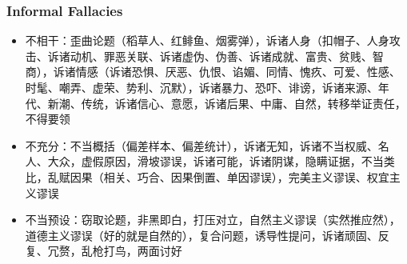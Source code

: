 \documentclass[UTF8,11pt,colorlinks,compress,openany]{beamer}%
\begin{document}
\begin{frame}\frametitle{Informal Fallacies}
\begin{itemize}
	\item 不相干：歪曲论题（稻草人、红鲱鱼、烟雾弹），诉诸人身（扣帽子、人身攻击、诉诸动机、罪恶关联、诉诸虚伪、伪善、诉诸成就、富贵、贫贱、智商），诉诸情感（诉诸恐惧、厌恶、仇恨、谄媚、同情、愧疚、可爱、性感、时髦、嘲弄、虚荣、势利、沉默），诉诸暴力、恐吓、诽谤，诉诸来源、年代、新潮、传统，诉诸信心、意愿，诉诸后果、中庸、自然，转移举证责任，不得要领
	\item 不充分：不当概括（偏差样本、偏差统计），诉诸无知，诉诸不当权威、名人、大众，虚假原因，滑坡谬误，诉诸可能，诉诸阴谋，隐瞒证据，不当类比，乱赋因果（相关、巧合、因果倒置、单因谬误），完美主义谬误、权宜主义谬误
	\item 不当预设：窃取论题，非黑即白，打压对立，自然主义谬误（实然推应然），道德主义谬误（好的就是自然的），复合问题，诱导性提问，诉诸顽固、反复、冗赘，乱枪打鸟，两面讨好
\end{itemize}
\end{frame}
\end{document}
